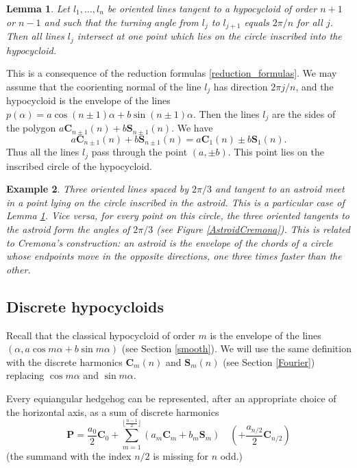 \documentclass[12pt]{article}
\makeatletter
\newtheorem{lemma}{Lemma}[section]
\newtheorem{example}[lemma]{Example}
\renewenvironment{proof}[1][\proofname] 
{\par\pushQED{\qed}\normalfont\topsep6\p@\@plus6\p@\relax\trivlist\item[\hskip\labelsep\bfseries#1\@addpunct{.}]\ignorespaces}{\popQED\endtrivlist\@endpefalse}
\renewcommand{\P}{\mathbf{P}}
\makeatother
\begin{document}
\begin{lemma}
\label{DHypocycl_onepoint} Let $l_1, \ldots, l_n$ be oriented lines tangent to a hypocycloid of order $n+1$ or $n-1$ and such that the turning angle from $l_j$ to $l_{j+1}$ equals $2\pi/n$ for all $j$. Then all lines $l_j$ intersect at one point which lies on the circle inscribed into the hypocycloid.
\end{lemma}
\begin{proof}
This is a  consequence  of the reduction formulas \eqref{reduction_formulas}. We may assume that the coorienting normal of the line $l_j$ has direction $2\pi j/n$, and the hypocycloid is the envelope of the lines $p(\alpha) = a\cos (n\pm1)\alpha + b\sin (n\pm1)\alpha$. Then the lines $l_j$ are the sides of the polygon $a\mathbf{C}_{n\pm 1}(n) + b\mathbf{S}_{n\pm 1}(n)$. We have
\[ a\mathbf{C}_{n\pm 1}(n) + b\mathbf{S}_{n\pm 1}(n) = a\mathbf{C}_1(n) \pm b\mathbf{S}_1(n).\]
Thus all the lines $l_j$ pass through the point $(a, \pm b)$. This point lies on the inscribed circle of the hypocycloid.
\end{proof}

\begin{example}
{\rm 
Three oriented lines spaced by $2\pi/3$ and tangent to an astroid meet in a point lying on the circle inscribed in the astroid. This is a particular case of Lemma \ref{DHypocycl_onepoint}. Vice versa, for every point on this circle, the three oriented tangents to the astroid form the angles of $2\pi/3$ (see Figure \ref{AstroidCremona}). This is related to Cremona's construction: an astroid is the envelope of the chords of a circle whose  endpoints move in the opposite directions, one three times faster than the other.
}
\end{example}	

\subsection{Discrete hypocycloids} \label{DiscrHypo}
Recall that the classical hypocycloid of order $m$ is the envelope of the lines $(\alpha, a\cos m\alpha+b\sin m\alpha)$ (see Section \ref{smooth}). We will use the same definition with the  discrete harmonics $\mathbf{C}_m(n)$ and $\mathbf{S}_m(n)$ (see Section \ref{Fourier}) replacing $\cos m\alpha$ and $\sin m\alpha$. 

Every equiangular hedgehog can be represented, after an appropriate choice of the horizontal axis, as a sum of discrete harmonics
\begin{equation}
\label{DiscrFourier}
\P = \frac{a_0}2 \mathbf{C}_0 + \sum_{m=1}^{\lfloor\frac{n-1}2\rfloor} (a_m \mathbf{C}_m + b_m \mathbf{S}_m) \quad \left( + \frac{a_{n/2}}2 \mathbf{C}_{n/2} \right)
\end{equation}
(the summand with the index $n/2$ is missing for $n$ odd.)
\end{document}
